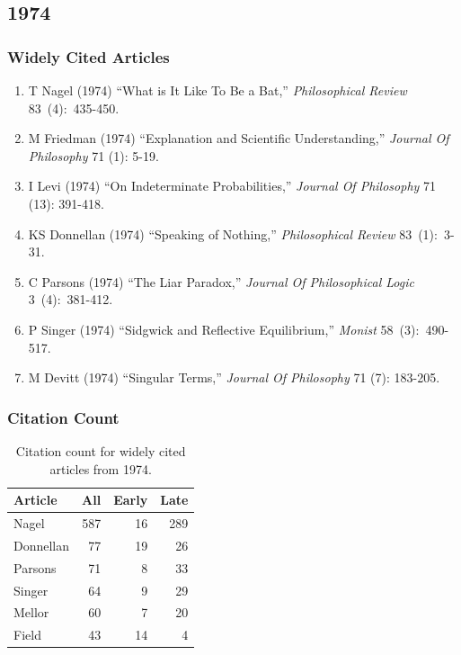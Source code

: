\documentclass[
  10pt,
  letterpaper,
  DIV=11,
  numbers=noendperiod,
  twoside]{scrartcl}
\providecommand{\tightlist}{%
  \setlength{\itemsep}{0pt}\setlength{\parskip}{0pt}}\usepackage{longtable,booktabs,array}
\begin{document}
\newpage

\subsection{1974}\label{sec-s1974}

\subsubsection*{Widely Cited Articles}\label{widely-cited-articles-17}

\begin{enumerate}
\def\labelenumi{\arabic{enumi}.}
\tightlist
\item
  T Nagel (1974) ``What is It Like To Be a Bat,'' \emph{Philosophical
  Review} 83~(4):~435-450.
\item
  M Friedman (1974) ``Explanation and Scientific Understanding,''
  \emph{Journal Of Philosophy} 71 (1): 5-19.
\item
  I Levi (1974) ``On Indeterminate Probabilities,'' \emph{Journal Of
  Philosophy} 71 (13): 391-418.
\item
  KS Donnellan (1974) ``Speaking of Nothing,'' \emph{Philosophical
  Review} 83~(1):~3-31.
\item
  C Parsons (1974) ``The Liar Paradox,'' \emph{Journal Of Philosophical
  Logic} 3~(4):~381-412.
\item
  P Singer (1974) ``Sidgwick and Reflective Equilibrium,'' \emph{Monist}
  58~(3):~490-517.
\item
  M Devitt (1974) ``Singular Terms,'' \emph{Journal Of Philosophy} 71
  (7): 183-205.
\end{enumerate}

\subsubsection*{Citation Count}\label{sec-count-1974}

\begin{longtable}[]{@{}lrrr@{}}

\caption{\label{tbl-citation-count-1974}Citation count for widely cited
articles from 1974.}

\tabularnewline

\toprule\noalign{}
Article & All & Early & Late \\
\midrule\noalign{}
\endhead
\bottomrule\noalign{}
\endlastfoot
Nagel & 587 & 16 & 289 \\
Donnellan & 77 & 19 & 26 \\
Parsons & 71 & 8 & 33 \\
Singer & 64 & 9 & 29 \\
Mellor & 60 & 7 & 20 \\
Field & 43 & 14 & 4 \\

\end{longtable}
\end{document}
